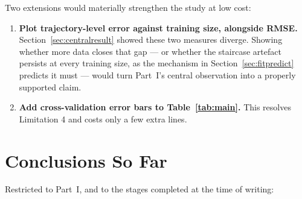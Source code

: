 \documentclass[11pt,a4paper]{article}
\begin{document}
Two extensions would materially strengthen the study at low cost:

\begin{enumerate}[leftmargin=2em,itemsep=0.2em]
  \item \textbf{Plot trajectory-level error against training size, alongside RMSE.}
        Section~\ref{sec:centralresult} showed these two measures diverge. Showing whether more data
        closes that gap --- or whether the staircase artefact persists at every training size, as the
        mechanism in Section~\ref{sec:fitpredict} predicts it must --- would turn Part~I's central
        observation into a properly supported claim.
  \item \textbf{Add cross-validation error bars to Table~\ref{tab:main}.} This resolves Limitation 4
        and costs only a few extra lines.
\end{enumerate}

\section{Conclusions So Far}\label{sec:conclusion}

Restricted to Part~I, and to the stages completed at the time of writing:
\end{document}
